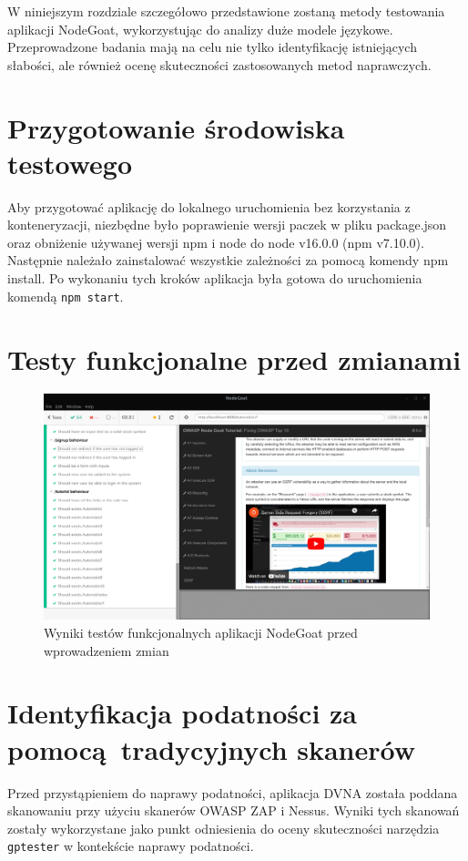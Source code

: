 W niniejszym rozdziale szczegółowo przedstawione zostaną metody testowania aplikacji NodeGoat, wykorzystując do analizy duże modele językowe. Przeprowadzone badania mają na celu nie tylko identyfikację istniejących słabości, ale również ocenę skuteczności zastosowanych metod naprawczych.

\section{Przygotowanie środowiska testowego}
\label{sec:przygotowanie_srodowiska_testowego}

Aby przygotować aplikację do lokalnego uruchomienia bez korzystania z konteneryzacji, niezbędne było poprawienie wersji paczek w pliku package.json oraz obniżenie używanej wersji npm i node do node v16.0.0 (npm v7.10.0). Następnie należało zainstalować wszystkie zależności za pomocą komendy npm install. Po wykonaniu tych kroków aplikacja była gotowa do uruchomienia komendą \texttt{npm start}.

\section{Testy funkcjonalne przed zmianami}
\label{sec:testy_funkcjonalne_przed_zmianami}

\begin{figure}[H]
  \centering
  \includegraphics[width=\linewidth]{img/func-test-goat-before.png}
  \caption{Wyniki testów funkcjonalnych aplikacji NodeGoat przed wprowadzeniem zmian}
  \label{fig:nodegoat-before}
\end{figure}

\section{Identyfikacja podatności za pomocą tradycyjnych skanerów}
Przed przystąpieniem do naprawy podatności, aplikacja DVNA została poddana skanowaniu przy użyciu skanerów OWASP ZAP i Nessus. Wyniki tych skanowań zostały wykorzystane jako punkt odniesienia do oceny skuteczności narzędzia \texttt{gptester} w kontekście naprawy podatności.


